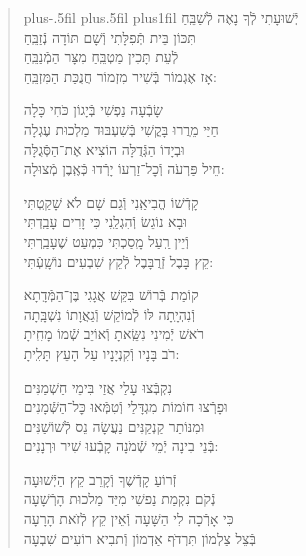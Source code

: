 \documentclass[twoside, openany, parskip=half, 11pt]{book}
\begin{document}
\begin{quote}
\leftskip=0pt plus-.5fil
\rightskip=0pt plus.5fil
\parfillskip=0pt plus1fil
יְֿשׁוּעָתִי \hfill לְֿךָ נָאֶה לְֿשַׁבֵּֽחַ \\ תִּכּוֹן בֵּית תְּֿפִלָּתִי \hfill וְֿשָׁם תּוֹדָה נְֿזַבֵּֽחַ \\
לְֿעֵת תָּכִין מַטְבֵּֽחַ \hfill מִצָּר הַמְֿנַבֵּֽחַ \\ אָז אֶגְמוֹר בְּֿשִׁיר מִזְמוֹר \hfill חֲנֻכַּת הַמִּזְבֵּֽחַ:

שָׂבְֿעָה נַפְשִׁי \hfill בְּֿיָגוֹן כֹּחִי כָּלָה \\ חַיַּי מֵרֲרוּ בָּקֳשִׁי \hfill בְּֿשִׁעְבּוּד מַלְכוּת עֶגְלָה \\
וּבְיָדוֹ הַגְּֿדֻלָּה \hfill הוֹצִיא אֶת־הַסְּֿגֻלָּה \\ חֵיל פַּרְעֹה וְֿכׇל־זַרְעוֹ \hfill יָרְֿדוּ כְּֿאֶֽבֶן מְֿצוּלָה:

קָדְֿשׁוֹ הֱבִיאַֽנִי \hfill וְֿגַם שָׁם לֹא שָׁקַֽטְתִּי \\ וּבָא נוֹגֵשׂ וְֿהִגְלַֽנִי \hfill כִּי זָרִים עָבַֽדְתִּי \\
וְֿיֵין רַֽעַל מָֽסַכְתִּי \hfill כִּמְעַט שֶׁעָבַֽרְתִּי \\ קֵץ בָּבֶל זְֿרֻבָּבֶל \hfill לְֿקֵץ שִׁבְעִים נוֹשָֽׁעְֿתִּי:

קוֹמַת בְּֿרוֹשׁ בִּקֵּשׁ \hfill אֲגָגִי בֶּן־הַמְּֿדָֽתָא \\ וְֿנִהְיָֽתָה לּוֹ לְֿמוֹקֵשׁ \hfill וְֿגַאֲוָתוֹ נִשְׁבָּֽתָה \\
רֹאשׁ יְֿמִינִי נִשֵּֽׂאתָ \hfill וְֿאוֹיֵב שְֿׁמוֹ מָחִֽיתָ \\ רֹב בָּנָיו וְֿקִנְיָנָיו \hfill עַל הָעֵץ תָּלִֽיתָ:

נִקְבְּֿצוּ עָלַי \hfill אֲזַי בִּימֵי חַשְׁמַנִּים \\ וּפָרְֿצוּ חוֹמוֹת מִגְדָּלַי \hfill וְֿטִמְּֿאוּ כׇּל־הַשְּֿׁמָנִים \\
וּמִנּוֹתַר קַנְקַנִּים \hfill נַעֲשָׂה נֵס לְֿשׁוֹשַׁנִּים \\ בְּֿנֵי בִינָה יְֿמֵי שְֿׁמֹנָה \hfill קָבְֿעוּ שִׁיר וּרְנָנִים:


זְֿרוֹעַ קָדְֿשֶׁךָ \hfill וְֿקָרֵב קֵץ הַיְֿשׁוּעָה\\
נְֿקֹם נִקְמַת נַפשִׁי \hfill מִיַּד מַלכוּת הָרְֿשָׁעָה\\
כִּי אָרְֿכָה לִי הַשָּׁעָה \hfill וְֿאֵין קֵץ לְֿזׂאת הָרָעָה\\
בְּֿצֵל צַלְמוֹן תִּרְדּׂף אַדְמוֹן \hfill וְֿתבִיא רוֹעִים שִׁבְעָה

\end{quote}
\end{document}
